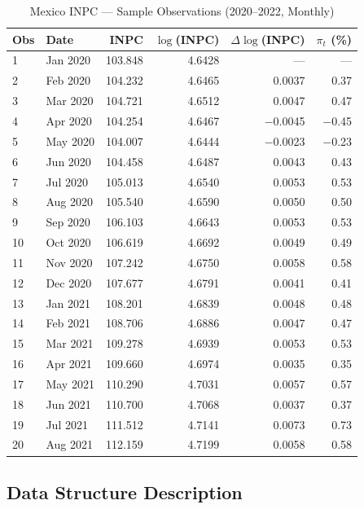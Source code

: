 \documentclass[12pt,a4paper]{article}
\begin{document}
\begin{table}[h!]
\centering
\caption{Mexico INPC — Sample Observations (2020–2022, Monthly)}
\label{tab:inpc_sample}
\begin{tabular}{llrrrr}
\toprule
\textbf{Obs} & \textbf{Date} & \textbf{INPC} & \textbf{$\log$(INPC)} & \textbf{$\Delta\log$(INPC)} & \textbf{$\pi_t$ (\%)} \\
\midrule
1  & Jan 2020 & 103.848 & 4.6428 & —      & — \\
2  & Feb 2020 & 104.232 & 4.6465 & 0.0037 & 0.37 \\
3  & Mar 2020 & 104.721 & 4.6512 & 0.0047 & 0.47 \\
4  & Apr 2020 & 104.254 & 4.6467 & $-$0.0045 & $-$0.45 \\
5  & May 2020 & 104.007 & 4.6444 & $-$0.0023 & $-$0.23 \\
6  & Jun 2020 & 104.458 & 4.6487 & 0.0043 & 0.43 \\
7  & Jul 2020 & 105.013 & 4.6540 & 0.0053 & 0.53 \\
8  & Aug 2020 & 105.540 & 4.6590 & 0.0050 & 0.50 \\
9  & Sep 2020 & 106.103 & 4.6643 & 0.0053 & 0.53 \\
10 & Oct 2020 & 106.619 & 4.6692 & 0.0049 & 0.49 \\
11 & Nov 2020 & 107.242 & 4.6750 & 0.0058 & 0.58 \\
12 & Dec 2020 & 107.677 & 4.6791 & 0.0041 & 0.41 \\
13 & Jan 2021 & 108.201 & 4.6839 & 0.0048 & 0.48 \\
14 & Feb 2021 & 108.706 & 4.6886 & 0.0047 & 0.47 \\
15 & Mar 2021 & 109.278 & 4.6939 & 0.0053 & 0.53 \\
16 & Apr 2021 & 109.660 & 4.6974 & 0.0035 & 0.35 \\
17 & May 2021 & 110.290 & 4.7031 & 0.0057 & 0.57 \\
18 & Jun 2021 & 110.700 & 4.7068 & 0.0037 & 0.37 \\
19 & Jul 2021 & 111.512 & 4.7141 & 0.0073 & 0.73 \\
20 & Aug 2021 & 112.159 & 4.7199 & 0.0058 & 0.58 \\
\bottomrule
\end{tabular}
\end{table}

\subsection{Data Structure Description}
\end{document}
